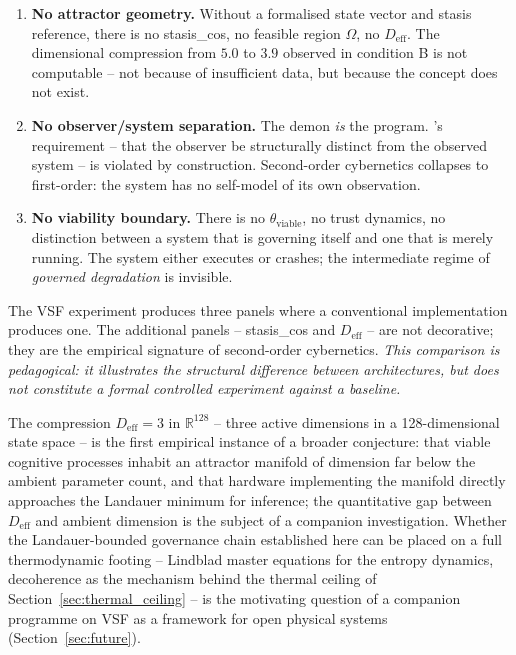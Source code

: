 \documentclass[11pt, a4paper]{article}
\begin{document}
\begin{enumerate}
  \item \textbf{No attractor geometry.}  Without a formalised state vector and
    stasis reference, there is no stasis\_cos, no feasible region $\Omega$,
    no $D_\text{eff}$.  The dimensional compression from $5.0$ to $3.9$ observed in
    condition B is not computable -- not because of insufficient data, but
    because the concept does not exist.
  \item \textbf{No observer/system separation.}  The demon \emph{is} the
    program.  \citeauthor{vonfoerster1979cybernetics}'s requirement -- that the observer be structurally
    distinct from the observed system -- is violated by construction.
    Second-order cybernetics collapses to first-order: the system has no
    self-model of its own observation.
  \item \textbf{No viability boundary.}  There is no $\theta_\text{viable}$,
    no trust dynamics, no distinction between a system that is governing itself
    and one that is merely running.  The system either executes or crashes;
    the intermediate regime of \emph{governed degradation} is invisible.
\end{enumerate}

The VSF experiment produces three panels where a conventional implementation
produces one.  The additional panels -- stasis\_cos and $D_\text{eff}$ -- are not
decorative; they are the empirical signature of second-order cybernetics.
\textit{This comparison is pedagogical: it illustrates the structural
difference between architectures, but does not constitute a formal
controlled experiment against a baseline.}

The compression $D_\text{eff} = 3$ in $\mathbb{R}^{128}$ -- three active dimensions
in a 128-dimensional state space -- is the first empirical instance of a broader
conjecture: that viable cognitive processes inhabit an attractor manifold of
dimension far below the ambient parameter count, and that hardware implementing
the manifold directly approaches the Landauer minimum for inference; the
quantitative gap between $D_\text{eff}$ and ambient dimension is the subject of
a companion investigation.
Whether the Landauer-bounded governance chain established here can be placed on a
full thermodynamic footing -- Lindblad master equations for the entropy dynamics,
decoherence as the mechanism behind the thermal ceiling of
Section~\ref{sec:thermal_ceiling} -- is the motivating question of a companion
programme on VSF as a framework for open physical systems
(Section~\ref{sec:future}).
\end{document}
